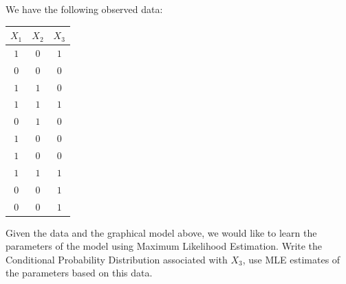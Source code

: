 \documentclass[11pt,addpoints,answers]{exam}
\begin{document}
\begin{questions}
\begin{center}
\end{center}




We have the following observed data: \\
\begin{center}
\begin{tabular}{|c|c|c|}
    \hline
            $X_1$ & $X_2$ & $X_3$   \\  \hline
       $1$ & $0$ & $1$ \\  \hline
       $0$ & $0$ & $0$  \\  \hline
       $1$ & $1$ & $0$  \\  \hline
       $1$ & $1$ & $1$  \\  \hline
       $0$ & $1$ & $0$  \\  \hline
       $1$ & $0$ & $0$  \\  \hline
       $1$ & $0$ & $0$  \\  \hline
       $1$ & $1$ & $1$  \\  \hline
       $0$ & $0$ & $1$  \\  \hline
       $0$ & $0$ & $1$  \\  \hline
    \end{tabular}
\end{center}
    
    
\begin{questions}


\question[2] Given the data and the graphical model above, we would like to learn the parameters of the model using Maximum Likelihood Estimation. Write the Conditional Probability Distribution associated with $X_3$, use MLE estimates of the parameters based on this data. 

\begin{your_solution}[title=Your Answer:,height=5cm,width=15cm]
\end{your_solution}


\end{questions}
\end{questions}
\end{document}
